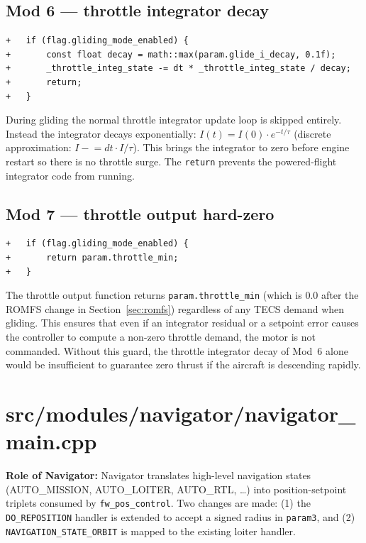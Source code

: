 \documentclass[12pt,a4paper]{article}
\begin{document}
\subsection{Mod 6 — throttle integrator decay}

\begin{lstlisting}[style=diff]
+	if (flag.gliding_mode_enabled) {
+		const float decay = math::max(param.glide_i_decay, 0.1f);
+		_throttle_integ_state -= dt * _throttle_integ_state / decay;
+		return;
+	}
\end{lstlisting}
\begin{annotation}During gliding the normal throttle integrator update loop is skipped entirely. Instead the integrator decays exponentially: $I(t) = I(0) \cdot e^{-t/\tau}$ (discrete approximation: $I \mathrel{-}= dt \cdot I / \tau$). This brings the integrator to zero before engine restart so there is no throttle surge. The \texttt{return} prevents the powered-flight integrator code from running.\end{annotation}

\subsection{Mod 7 — throttle output hard-zero}

\begin{lstlisting}[style=diff]
+	if (flag.gliding_mode_enabled) {
+		return param.throttle_min;
+	}
\end{lstlisting}
\begin{annotation}The throttle output function returns \texttt{param.throttle\_min} (which is 0.0 after the ROMFS change in Section~\ref{sec:romfs}) regardless of any TECS demand when gliding. This ensures that even if an integrator residual or a setpoint error causes the controller to compute a non-zero throttle demand, the motor is not commanded. Without this guard, the throttle integrator decay of Mod~6 alone would be insufficient to guarantee zero thrust if the aircraft is descending rapidly.\end{annotation}

\section{src/modules/navigator/navigator\_main.cpp}

\begin{annotation}
\textbf{Role of Navigator:} Navigator translates high-level navigation states (AUTO\_MISSION, AUTO\_LOITER, AUTO\_RTL, \ldots) into position-setpoint triplets consumed by \texttt{fw\_pos\_control}. Two changes are made: (1) the \texttt{DO\_REPOSITION} handler is extended to accept a signed radius in \texttt{param3}, and (2) \texttt{NAVIGATION\_STATE\_ORBIT} is mapped to the existing loiter handler.
\end{annotation}
\end{document}
